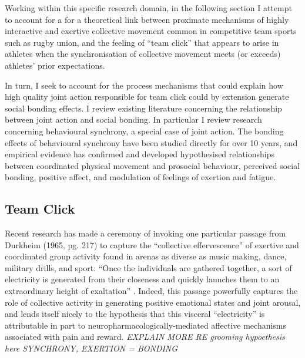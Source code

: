 Working within this specific research domain, in the following section I attempt to account for a for a theoretical link between proximate mechanisms of highly interactive and exertive collective movement common in competitive team sports such as rugby union, and the feeling of ``team click'' that appears to arise in athletes when the synchronisation of collective movement meets (or exceeds) athletes' prior expectations.

In turn, I seek to account for the process mechanisms that could explain how high quality joint action responsible for team click could by extension generate social bonding effects.  I review existing literature concerning the relationship between joint action and social bonding. In particular I review research concerning behavioural synchrony, a special case of joint action. The bonding effects of behavioural synchrony have been studied directly for over 10 years, and empirical evidence has confirmed and developed hypothesised relationships between coordinated physical movement and prosocial behaviour, perceived social bonding, positive affect, and modulation of feelings of exertion and fatigue.



\subsection{Team Click}
Recent research has made a ceremony of invoking one particular passage from Durkheim (1965, pg. 217) to capture the ``collective effervescence'' of exertive and coordinated group activity found in arenas as diverse as music making, dance, military drills, and sport:  ``Once the individuals are gathered together, a sort of electricity is generated from their closeness and quickly launches them to an extraordinary height of exaltation'' \citep{McNeill1995,Konvalinka2011,Fischer2014,Mogan2017}. Indeed, this passage powerfully captures the role of collective activity in generating positive emotional states and joint arousal, and lends itself nicely to the hypothesis that this visceral ``electricity'' is attributable in part to neuropharmacologically-mediated affective mechanisms associated with pain and reward\citep{Dunbar2008,Cohen2009,Fischer2014,Launay2016}.   \textit{EXPLAIN MORE RE grooming hypoethesis here  SYNCHRONY, EXERTION = BONDING}

